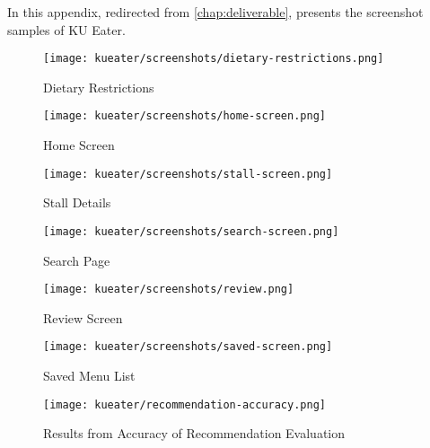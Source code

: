 In this appendix, redirected from \ref{chap:deliverable}, presents the screenshot samples of KU Eater.

\begin{figure}[h!]
    \centering
    \texttt{[image: kueater/screenshots/dietary-restrictions.png]}
    \caption{Dietary Restrictions}
    \label{fig:dietary-restrictions-screen}
\end{figure}

\begin{figure}[h!]
    \centering
    \texttt{[image: kueater/screenshots/home-screen.png]}
    \caption{Home Screen}
    \label{fig:home-screen}
\end{figure}

\begin{figure}[h!]
    \centering
    \texttt{[image: kueater/screenshots/stall-screen.png]}
    \caption{Stall Details}
    \label{fig:stall-screen}
\end{figure}

\begin{figure}[h!]
    \centering
    \texttt{[image: kueater/screenshots/search-screen.png]}
    \caption{Search Page}
    \label{fig:search-screen}
\end{figure}

\begin{figure}[h!]
    \centering
    \texttt{[image: kueater/screenshots/review.png]}
    \caption{Review Screen}
    \label{fig:review-screen}
\end{figure}

\begin{figure}[h!]
    \centering
    \texttt{[image: kueater/screenshots/saved-screen.png]}
    \caption{Saved Menu List}
    \label{fig:saved-screen}
\end{figure}



\begin{figure}[h!]
    \centering
    \texttt{[image: kueater/recommendation-accuracy.png]}
    \caption{Results from Accuracy of Recommendation Evaluation}
    \label{fig:recommendation-accuracy}
\end{figure}

